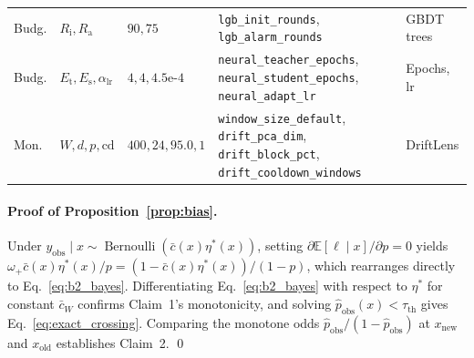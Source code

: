 \documentclass[pdflatex,sn-basic]{sn-jnl}
\theoremstyle{definition}
\theoremstyle{plain}
\begin{document}
\begin{appendices}
\begin{table}[t]
\begin{tabularx}{\textwidth}{lllL{3.70cm}Y}
Budg. & $R_{\text{i}}, R_{\text{a}}$ & $90, 75$ & \texttt{lgb\_\allowbreak init\_\allowbreak rounds}, \texttt{lgb\_\allowbreak alarm\_\allowbreak rounds} & GBDT trees \\
Budg. & $E_{\text{t}}, E_{\text{s}}, \alpha_{\text{lr}}$ & $4, 4, 4.5\text{e-}4$ & \texttt{neural\_\allowbreak teacher\_\allowbreak epochs}, \texttt{neural\_\allowbreak student\_\allowbreak epochs}, \texttt{neural\_\allowbreak adapt\_\allowbreak lr} & Epochs, lr \\
Mon. & $W, d, p, \text{cd}$ & $400, 24, 95.0, 1$ & \texttt{window\_\allowbreak size\_\allowbreak default}, \texttt{drift\_\allowbreak pca\_\allowbreak dim}, \texttt{drift\_\allowbreak block\_\allowbreak pct}, \texttt{drift\_\allowbreak cooldown\_\allowbreak windows} & DriftLens \\
\bottomrule
\end{tabularx}
\vspace{2pt}\par{}
\end{table}

\paragraph{Proof of Proposition~\ref{prop:bias}.}
Under $y_{\text{obs}} \mid x \sim \operatorname{Bernoulli}(\bar{c}(x)\eta^*(x))$, setting $\partial \mathbb{E}[\ell \mid x]/\partial p = 0$ yields $\omega_+ \bar{c}(x)\eta^*(x)/p = (1 - \bar{c}(x)\eta^*(x))/(1 - p)$, which rearranges directly to Eq.~\eqref{eq:b2_bayes}. Differentiating Eq.~\eqref{eq:b2_bayes} with respect to $\eta^*$ for constant $\bar{c}_W$ confirms Claim~1's monotonicity, and solving $\hat{p}_{\text{obs}}(x) < \tau_{\text{th}}$ gives Eq.~\eqref{eq:exact_crossing}. Comparing the monotone odds $\hat{p}_{\text{obs}}/(1 - \hat{p}_{\text{obs}})$ at $x_{\text{new}}$ and $x_{\text{old}}$ establishes Claim~2. \qed


\end{appendices}
\end{document}
